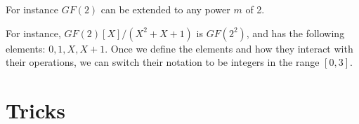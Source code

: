 For instance $GF(2)$ can be extended to any power $m$ of 2.

For instance, $GF(2)[X]/(X^2+X+1)$ is $GF(2^2)$, and has the following elements:
$0,1,X,X+1$. Once we define the elements and how they interact with their operations, we can 
switch their notation to be integers in the range $[0,3]$. 


\section{Tricks}
